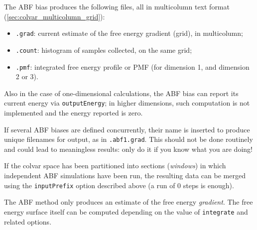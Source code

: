 
The ABF bias produces the following files, all in multicolumn text format (\ref{sec:colvar_multicolumn_grid}):
\begin{itemize}
\item \outputName\texttt{.grad}: current estimate of the free energy gradient (grid),
  in multicolumn;
\item \outputName\texttt{.count}: histogram of samples collected, on the same grid;
\item \outputName\texttt{.pmf}: integrated free energy profile or PMF (for dimension 1, and dimension 2 or 3).
\end{itemize}

Also in the case of one-dimensional calculations, the ABF bias can report its current energy via \texttt{outputEnergy}; in higher dimensions, such computation is not implemented and the energy reported is zero.

If several ABF biases are defined concurrently, their name is inserted to produce
unique filenames for output, as in \outputName\texttt{.abf1.grad}.
This should not be done routinely and could lead to meaningless results:
only do it if you know what you are doing!

If the colvar space has been partitioned into sections (\emph{windows}) in which independent
ABF simulations have been run, the resulting data can be merged using the
\texttt{inputPrefix} option described above (a run of 0 steps is enough).




The ABF method only produces an estimate of the free energy \emph{gradient}.
The free energy surface itself can be computed depending on the value of \texttt{integrate} and related options.

